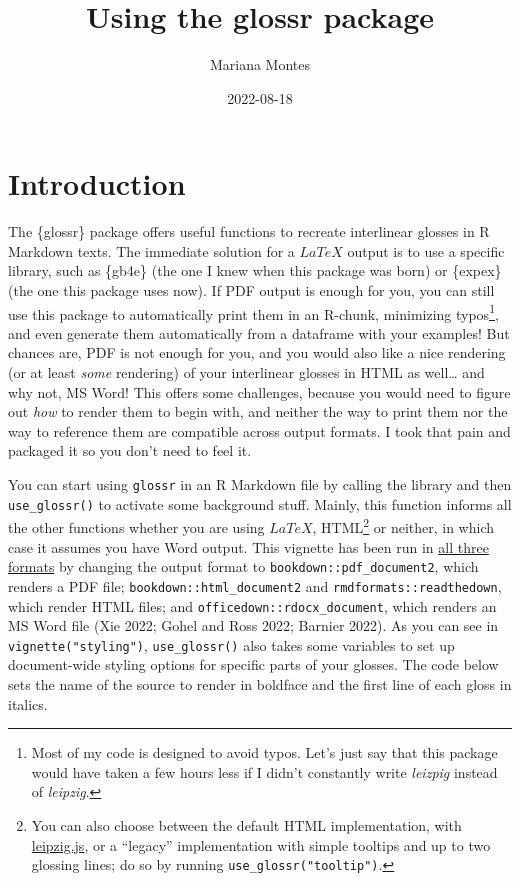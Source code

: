 \documentclass[
]{article}
\title{Using the glossr package}
\author{Mariana Montes}
\date{2022-08-18}
\begin{document}
\maketitle

{
\hypersetup{linkcolor=}
\setcounter{tocdepth}{2}
\tableofcontents
}
\hypertarget{introduction}{%
\section{Introduction}\label{introduction}}

The \{glossr\} package offers useful functions to recreate interlinear glosses in R Markdown texts.
The immediate solution for a \(LaTeX\) output is to use a specific library, such as \{gb4e\} (the one I knew when this package was born) or \{expex\} (the one this package uses now). If PDF output is enough for you, you can still use this package to automatically print them in an R-chunk, minimizing typos\footnote{Most of my code is designed to avoid typos. Let's just say that this package would have taken a few hours less if I didn't constantly write \emph{leizpig} instead of \emph{leipzig}.}, and even generate them automatically from a dataframe with your examples!
But chances are, PDF is not enough for you, and you would also like a nice rendering (or at least \emph{some} rendering) of your interlinear glosses in HTML as well\ldots{} and why not, MS Word! This offers some challenges, because you would need to figure out \emph{how} to render them to begin with, and neither the way to print them nor the way to reference them are compatible across output formats.
I took that pain and packaged it so you don't need to feel it.

You can start using \texttt{glossr} in an R Markdown file by calling the library and then \texttt{use\_glossr()} to activate some background stuff. Mainly, this function informs all the other functions whether you are using \(LaTeX\), HTML\footnote{You can also choose between the default HTML implementation, with \href{https://github.com/bdchauvette/leipzig.js/}{leipzig.js}, or a ``legacy'' implementation with simple tooltips and up to two glossing lines; do so by running \texttt{use\_glossr("tooltip")}.} or neither, in which case it assumes you have Word output. This vignette has been run in \href{https://github.com/montesmariana/glossr/tree/main/inst/examples}{all three formats} by changing the output format to
\texttt{bookdown::pdf\_document2}, which renders a PDF file;
\texttt{bookdown::html\_document2} and \texttt{rmdformats::readthedown}, which render HTML files;
and \texttt{officedown::rdocx\_document}, which renders an MS Word file (Xie 2022; Gohel and Ross 2022; Barnier 2022). As you can see in \texttt{vignette("styling")}, \texttt{use\_glossr()} also takes some variables to set up document-wide styling options for specific parts of your glosses. The code below sets the name of the source to render in boldface and the first line of each gloss in italics.
\end{document}
